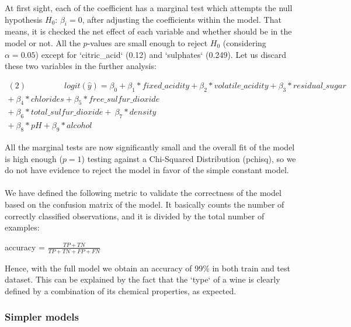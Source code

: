 \documentclass[10pt]{article}
\begin{document}
At first sight, each of the coefficient has a marginal test which attempts the null hypothesis $H_0$: $\beta_i = 0$, after adjusting the coefficients within the model. That means, it is checked the net effect of each variable and whether should be in the model or not. All the $p$-values are small enough to reject $H_0$ (considering $\alpha = 0.05$) except for `citric\_acid` (0.12) and `sulphates` (0.249). Let us discard these two variables in the further analysis:

\begin{equation*}
\begin{aligned}	
(2) \ \ \ \  \ \ \ \ \ \ \ \ \ \ \ \ \ \ \ \ \  logit(\hat{y}) = \beta_0 + \beta_1*fixed\_acidity + \beta_2*volatile\_acidity 
+\beta_3*residual\_sugar \\
+ \ \beta_4*chlorides + \beta_5*free\_sulfur\_dioxide  \\+ \ \beta_6*total\_sulfur\_dioxide   
+ \ \beta_7*density \\ + \ \beta_8*pH  +  \beta_{9}*alcohol
\end{aligned}
\end{equation*}

All the marginal tests are now significantly small and the overall fit of the model is high enough ($p = 1$) testing against a Chi-Squared Distribution (pchisq), so we do not have evidence to reject the model in favor of the simple constant model.

\paragraph*{}
We have defined the following metric to validate the correctness of the model based on the confusion matrix of the model. It basically counts the number of correctly classified observations, and it is divided by the total number of examples:

\begin{center}
	accuracy = $\displaystyle \frac{TP+TN}{TP+TN+FP+FN}$
\end{center}

Hence, with the full model we obtain an accuracy of 99\% in both train and test dataset. This can be explained by the fact that the `type` of a wine is clearly defined by a combination of its chemical properties, as expected.

\subsubsection{Simpler models}
\end{document}
